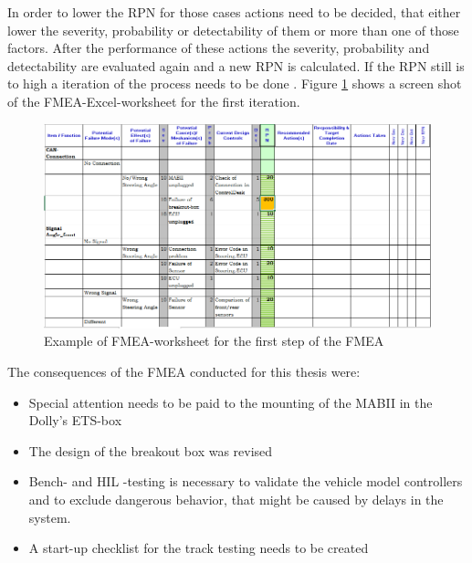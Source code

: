 \documentclass[ExampleMasters.tex]{subfiles}
\begin{document}
In order to lower the \gls{RPN} for those cases actions need to be decided, that either lower the severity, probability or detectability of them or more than one of those factors. After the performance of these actions the severity, probability and detectability are evaluated again and a new \gls{RPN} is calculated. If the \gls{RPN} still is to high a iteration of the process needs to be done \cite{din_60812_fmea}.
Figure \ref{fig:fmea_example} shows a screen shot of the FMEA-Excel-worksheet for the first iteration.    
\begin{figure}[!htb]
	\centering
	\includegraphics[width=1.0\linewidth]{figures/fmea_example}
	\caption{Example of \acrshort{FMEA}-worksheet for the first step of the \acrshort{FMEA}}
	\label{fig:fmea_example}
\end{figure}
The consequences of the \gls{FMEA} conducted for this thesis were:
\begin{itemize}
	\item Special attention needs to be paid to the mounting of the \gls{MABII} in the Dolly's \gls{ETS}-box
	\item The design of the breakout box was revised
	\item Bench- and \gls{HIL} -testing is necessary to validate  the vehicle model controllers and to exclude dangerous behavior, that might be caused by delays in the system. 
	\item A start-up checklist for the track testing needs to be created	 
\end{itemize}  
\end{document}
